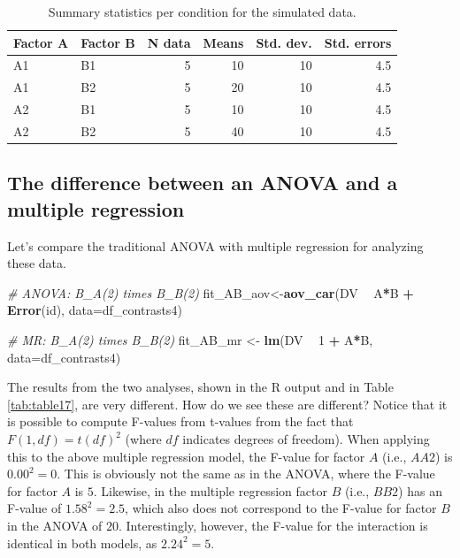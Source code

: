 \documentclass[12pt,]{krantz}
\newenvironment{Shaded}{\begin{snugshade}}{\end{snugshade}}
\newcommand{\CommentTok}[1]{\textcolor[rgb]{0.56,0.35,0.01}{\textit{#1}}}
\newcommand{\DataTypeTok}[1]{\textcolor[rgb]{0.13,0.29,0.53}{#1}}
\newcommand{\DecValTok}[1]{\textcolor[rgb]{0.00,0.00,0.81}{#1}}
\newcommand{\KeywordTok}[1]{\textcolor[rgb]{0.13,0.29,0.53}{\textbf{#1}}}
\newcommand{\NormalTok}[1]{#1}
\newcommand{\OperatorTok}[1]{\textcolor[rgb]{0.81,0.36,0.00}{\textbf{#1}}}
\newcommand{\StringTok}[1]{\textcolor[rgb]{0.31,0.60,0.02}{#1}}
\begin{document}
\begin{table}[h]

\caption{\label{tab:cTab4Means}Summary statistics per condition for the simulated data.}
\centering
\begin{tabular}[t]{llrrrr}
\toprule
Factor A & Factor B & N data & Means & Std. dev. & Std. errors\\
\midrule
A1 & B1 & 5 & 10 & 10 & 4.5\\
A1 & B2 & 5 & 20 & 10 & 4.5\\
A2 & B1 & 5 & 10 & 10 & 4.5\\
A2 & B2 & 5 & 40 & 10 & 4.5\\
\bottomrule
\end{tabular}
\end{table}

\hypertarget{the-difference-between-an-anova-and-a-multiple-regression}{%
\subsection{The difference between an ANOVA and a multiple regression}\label{the-difference-between-an-anova-and-a-multiple-regression}}

Let's compare the traditional ANOVA with multiple regression for analyzing these data.

\begin{Shaded}
\begin{Highlighting}[]
\CommentTok{# ANOVA: B_A(2) times B_B(2)}
\NormalTok{fit_AB_aov<-}\KeywordTok{aov_car}\NormalTok{(DV }\OperatorTok{~}\StringTok{ }\NormalTok{A}\OperatorTok{*}\NormalTok{B }\OperatorTok{+}\StringTok{ }\KeywordTok{Error}\NormalTok{(id), }\DataTypeTok{data=}\NormalTok{df_contrasts4)}

\CommentTok{# MR: B_A(2) times B_B(2)}
\NormalTok{fit_AB_mr <-}\StringTok{ }\KeywordTok{lm}\NormalTok{(DV }\OperatorTok{~}\StringTok{ }\DecValTok{1} \OperatorTok{+}\StringTok{ }\NormalTok{A}\OperatorTok{*}\NormalTok{B, }\DataTypeTok{data=}\NormalTok{df_contrasts4)}
\end{Highlighting}
\end{Shaded}

The results from the two analyses, shown in the R output and in Table \ref{tab:table17}, are very different.
How do we see these are different? Notice that it is possible to compute F-values from t-values from the fact that \(F(1,df) = t(df)^2\) \citep{snedecor1967statistical} (where \(df\) indicates degrees of freedom). When applying this to the above multiple regression model, the F-value for factor \(A\) (i.e., \(AA2\)) is \(0.00^2 = 0\). This is obviously not the same as in the ANOVA, where the F-value for factor \(A\) is \(5\). Likewise, in the multiple regression factor \(B\) (i.e., \(BB2\)) has an F-value of \(1.58^2 = 2.5\), which also does not correspond to the F-value for factor \(B\) in the ANOVA of \(20\). Interestingly, however, the F-value for the interaction is identical in both models, as \(2.24^2 = 5\).
\end{document}
